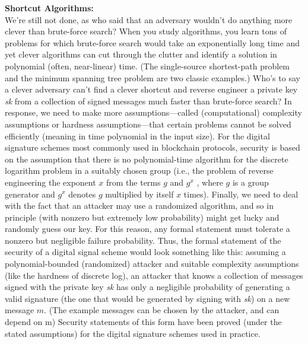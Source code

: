 \vspace{0.3cm}
\noindent
\textbf{Shortcut Algorithms:} \\
We’re still not done, as who said that an adversary wouldn’t do anything more clever than
brute-force search? When you study algorithms, you learn tons of problems for which brute-force search would take an exponentially long time and yet clever algorithms can cut through
the clutter and identify a solution in polynomial (often, near-linear) time. (The single-source
shortest-path problem and the minimum spanning tree problem are two classic examples.)
Who’s to say a clever adversary can’t find a clever shortcut and reverse engineer a private key
\textit{sk} from a collection of signed messages much faster than brute-force search? In response, we
need to make more assumptions—called (computational) complexity assumptions or hardness
assumptions—that certain problems cannot be solved efficiently (meaning in time polynomial
in the input size). For the digital signature schemes most commonly used in blockchain
protocols, security is based on the assumption that there is no polynomial-time algorithm
for the discrete logarithm problem in a suitably chosen group (i.e., the problem of reverse
engineering the exponent $x$ from the terms $g$ and $g^x$
, where $g$ is a group generator and $g^x$
denotes $g$ multiplied by itself $x$ times).
Finally, we need to deal with the fact that an attacker may use a randomized algorithm,
and so in principle (with nonzero but extremely low probability) might get lucky and randomly guess our key. For this reason, any formal statement must tolerate a nonzero but
negligible failure probability. Thus, the formal statement of the security of a digital signal
scheme would look something like this: assuming a polynomial-bounded (randomized) attacker and suitable complexity assumptions (like the hardness of discrete log), an attacker
that knows a collection of messages signed with the private key \textit{sk} has only a negligible probability of generating a valid signature (the one that would be generated by signing with \textit{sk})
on a new message $m$. (The example messages can be chosen by the attacker, and can depend
on m) Security statements of this form have been proved (under the stated assumptions)
for the digital signature schemes used in practice.

